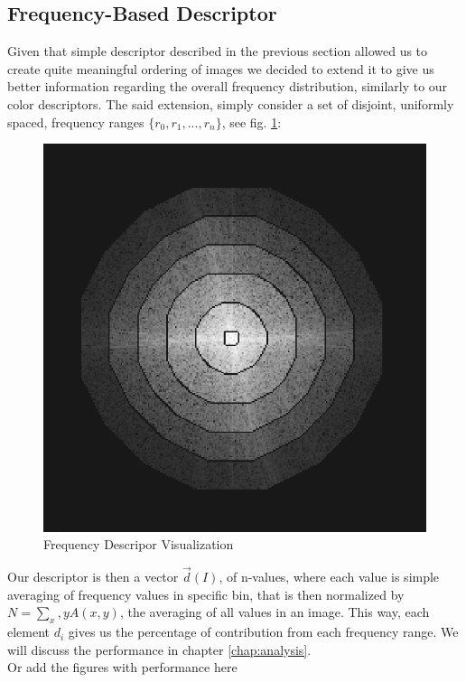 \documentclass{report}
\begin{document}
\subsection{Frequency-Based Descriptor}
Given that simple descriptor described in the previous section allowed us to create quite meaningful ordering of images we decided to extend it to give us better information regarding the overall frequency distribution, similarly to our color descriptors. The said extension, simply consider a set of disjoint, uniformly spaced, frequency ranges $\{r_0, r_1, ..., r_n\}$, see fig. \ref{fig:freqDescriptor}:
\begin{figure}[hbtp]
\centering
\includegraphics[scale=0.3]{graphics/freq_bins.png}
\caption{Frequency Descripor Visualization}
\label{fig:freqDescriptor}
\end{figure}

Our descriptor is then a vector $\vec{d}(I)$, of n-values, where each value is simple averaging of frequency values in specific bin, that is then normalized by $N = \sum_x,y A(x,y)$, the averaging of all values in an image. This way, each element $d_i$ gives us the percentage of contribution from each frequency range. We will discuss the performance in chapter \ref{chap:analysis}.\\

{\color{red}Or add the figures with performance here}
\end{document}
